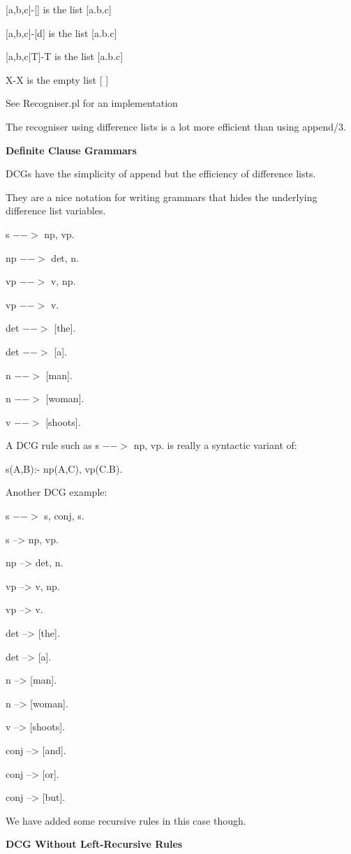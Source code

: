 \documentclass{article}
\begin{document}
[a,b,c]-[] is the list [a.b.c]

[a,b,c]-[d] is the list [a.b.c]

[a,b,c|T]-T is the list [a.b.c]

X-X is the empty list [ ]

See Recogniser.pl for an implementation

The recogniser using difference lists is a lot more efficient than using append/3. 


\textbf{Definite Clause Grammars}

DCGs have the simplicity of append but the efficiency of difference lists.

They are a nice notation for writing grammars that hides the underlying difference list variables. 

s $-->$ np, vp. 

np $-->$ det, n. 

vp $-->$ v, np. 

vp $-->$ v. 

det $-->$ [the].     
       
det $-->$ [a]. 

n $-->$ [man].    
           
n $-->$ [woman].   
        
v $-->$ [shoots].


A DCG rule such as s $-->$ np, vp. is really a syntactic variant of:

s(A,B):- np(A,C), vp(C.B).


Another DCG example:

s $-->$ s, conj, s.    
       
s --> np, vp. 

np --> det, n.   
           
vp --> v, np.    
         
vp --> v. 
 
det --> [the].  
            
det --> [a]. 

n --> [man].    
            
n --> [woman].            

v --> [shoots]. 

conj --> [and].  
          
conj --> [or].    
        
conj --> [but].

We have added some recursive rules in this case though.


\textbf{DCG Without Left-Recursive Rules}
\end{document}
